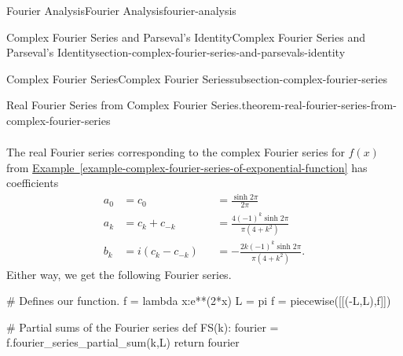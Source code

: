 \documentclass[oneside,10pt,]{book}
\numberwithin{equation}{section}
\newcommand{\amp}{&}
\begin{document}
\begin{chapterptx}{Fourier Analysis}{}{Fourier Analysis}{}{}{fourier-analysis}
\begin{sectionptx}{Complex Fourier Series and Parseval's Identity}{}{Complex Fourier Series and Parseval's Identity}{}{}{section-complex-fourier-series-and-parsevals-identity}
\begin{subsectionptx}{Complex Fourier Series}{}{Complex Fourier Series}{}{}{subsection-complex-fourier-series}
\begin{theorem}{Real Fourier Series from Complex Fourier Series.}{}{theorem-real-fourier-series-from-complex-fourier-series}
\begin{align*}
\end{align*}
%
\end{theorem}
\hypertarget{p-608}{}%
The real Fourier series corresponding to the complex Fourier series for \(f(x)\) from \hyperref[example-complex-fourier-series-of-exponential-function]{Example~\ref{example-complex-fourier-series-of-exponential-function}} has coefficients%
\begin{align*}
a_{0} \amp = c_{0} \amp \amp= \frac{\sinh2\pi}{2\pi} \\
a_{k} \amp = c_{k} + c_{-k} \amp \amp= \frac{4(-1)^{k}\sinh2\pi}{\pi(4+k^{2})} \\
b_{k} \amp = i(c_{k}-c_{-k}) \amp \amp= -\frac{2k(-1)^{k}\sinh2\pi}{\pi(4+k^{2})}. 
\end{align*}
Either way, we get the following Fourier series.%
\begin{sageinput}
# Defines our function.
f = lambda x:e**(2*x)
L = pi
f = piecewise([[(-L,L),f]])

# Partial sums of the Fourier series
def FS(k):
  fourier = f.fourier_series_partial_sum(k,L)
  return fourier


\end{sageinput}
\end{subsectionptx}
\end{sectionptx}
\end{chapterptx}
\end{document}
